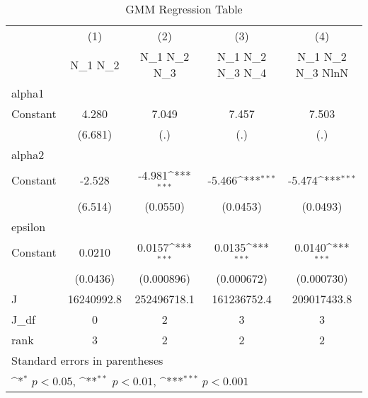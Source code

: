 \begin{table}[htbp]\centering
\def\sym#1{\ifmmode^{#1}\else\(^{#1}\)\fi}
\caption{GMM Regression Table}
\begin{tabular}{l*{4}{c}}
\hline\hline
                    &\multicolumn{1}{c}{(1)}&\multicolumn{1}{c}{(2)}&\multicolumn{1}{c}{(3)}&\multicolumn{1}{c}{(4)}\\
                    &\multicolumn{1}{c}{N\_1 N\_2}&\multicolumn{1}{c}{N\_1 N\_2 N\_3}&\multicolumn{1}{c}{N\_1 N\_2 N\_3 N\_4}&\multicolumn{1}{c}{N\_1 N\_2 N\_3 NlnN}\\
\hline
alpha1              &                     &                     &                     &                     \\
Constant            &       4.280         &       7.049         &       7.457         &       7.503         \\
                    &     (6.681)         &         (.)         &         (.)         &         (.)         \\
\hline
alpha2              &                     &                     &                     &                     \\
Constant            &      -2.528         &      -4.981\sym{***}&      -5.466\sym{***}&      -5.474\sym{***}\\
                    &     (6.514)         &    (0.0550)         &    (0.0453)         &    (0.0493)         \\
\hline
epsilon             &                     &                     &                     &                     \\
Constant            &      0.0210         &      0.0157\sym{***}&      0.0135\sym{***}&      0.0140\sym{***}\\
                    &    (0.0436)         &  (0.000896)         &  (0.000672)         &  (0.000730)         \\
\hline
J                   &  16240992.8         & 252496718.1         & 161236752.4         & 209017433.8         \\
J\_df                &           0         &           2         &           3         &           3         \\
rank                &           3         &           2         &           2         &           2         \\
\hline\hline
\multicolumn{5}{l}{\footnotesize Standard errors in parentheses}\\
\multicolumn{5}{l}{\footnotesize \sym{*} \(p<0.05\), \sym{**} \(p<0.01\), \sym{***} \(p<0.001\)}\\
\end{tabular}
\end{table}
